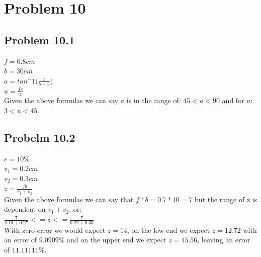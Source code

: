 \documentclass{article}
\begin{document}
\section{\textbf{Problem 10}}
\subsection{Problem 10.1}
\noindent$f = 0.8cm$\\
$b = 30cm$\\
$a = tan^-1 \big(\frac{z}{b-x}\big)$\\
$u = \frac{fx}{z}$\\

\noindent Given the above formulas we can say $a$ is in the range of: 
$45 < a < 90$ and for $u$: $3 < u < 45$.

\subsection{Probelm 10.2}
\noindent$e = 10\%$\\
$v_1 = 0.2cm$\\
$v_2 = 0.3cm$\\
$z = \frac{fb}{v_1 + v_2}$\\

\noindent Given the above formulas we can say that $f * b = 0.7 * 10 = 7$ but 
the range of z is dependent on $v_1 + v_2$, or:\\
$\frac{7}{0.18 + 0.27} <= z <= \frac{7}{0.22 + 0.33}$\\

\noindent With zero error we would expect $z = 14$, on the low end we expect 
$z = 12.72$ with an error of $9.0909\%$ and on the upper end we expect 
$z = 15.56$, leaving an error of $11.11111\%$.
\end{document}
